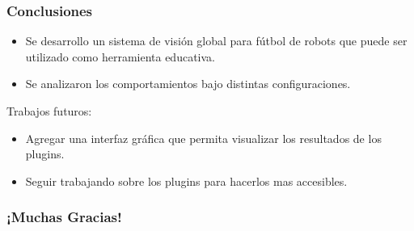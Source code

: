 \documentclass[11pt,a4paper,spanish]{beamer}
\begin{document}
\begin{frame}

\frametitle{Conclusiones}


\begin{itemize}

	\item Se desarrollo un sistema de visión global para fútbol de robots
		que puede ser utilizado como herramienta educativa.

	\item Se analizaron los comportamientos bajo distintas configuraciones.

\end{itemize}

Trabajos futuros:

\begin{itemize}

	\item Agregar una interfaz gráfica que permita visualizar los resultados
		de los plugins.

	\item Seguir trabajando sobre los plugins para hacerlos mas accesibles.

\end{itemize}

\end{frame}

\begin{frame}

	\frametitle{¡Muchas Gracias!}

\end{frame}




\end{document}
